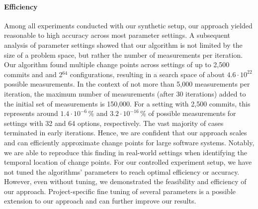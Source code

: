 \documentclass[sigconf]{acmart}
\begin{document}
	\paragraph{Efficiency} Among all experiments conducted with our synthetic setup, our approach yielded reasonable to high accuracy across most parameter settings. A subsequent analysis of parameter settings showed that our algorithm is not limited by the size of a problem space, but rather the number of measurements per iteration. 
	{\color{red}Our algorithm found multiple change points across settings of up to 2,500 commits and and 2$^{64}$ configurations, resulting in a search space of about $4.6 \cdot 10^{22}$ possible measurements.
	In the context of not more than 5,000 measurements per iteration, the maximum number of measurements (after 30 iterations) added to the initial set of measurements is 150,000. For a setting with 2,500 commits, this represents around $1.4 \cdot 10^{-6}$\,\% and $3.2\cdot 10^{-16}$\,\% of possible measurements for settings with 32 and 64 options, respectively. The vast majority of cases terminated in early iterations.} Hence, we are confident that our approach scales and can efficiently approximate change points for large software systems. Notably, we are able to reproduce this finding in real-world settings when identifying the temporal location of change points. For our controlled experiment setup, we have not tuned the algorithms’ parameters to reach optimal efficiency or accuracy. However, even without tuning, we demonstrated the feasibility and efficiency of our approach. Project-specific fine tuning of several parameters is a possible extension to our approach and can further improve our results.
	
\end{document}
